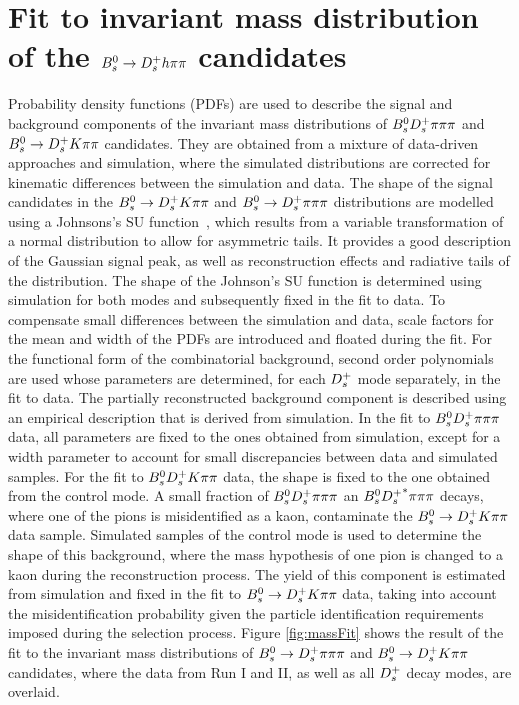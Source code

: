 \section{Fit to invariant mass distribution of the ${{B}^0_{s}}\rightarrow{\ensuremath{{D}^+_{s}}}{\ensuremath{h}}{\ensuremath{\pi}}{\ensuremath{\pi}}$ candidates}
\label{sec:Massfit}

Probability density functions (PDFs) are used to describe the signal and background components of the invariant mass distributions of ${{B}^0_{s}}{{D}^+_{s}}{\pi}{\pi}{\pi}$ and ${{B}^0_{s}}\rightarrow{\ensuremath{{D}^+_{s}}}{\ensuremath{K}}{\ensuremath{\pi}}{\ensuremath{\pi}}$ candidates.
They are obtained from a mixture of data-driven approaches and simulation, where the simulated distributions are corrected for kinematic differences between the simulation and data.\newline
The shape of the signal candidates in the ${{B}^0_{s}}\rightarrow{\ensuremath{{D}^+_{s}}}{\ensuremath{K}}{\ensuremath{\pi}}{\ensuremath{\pi}}$ and ${{B}^0_{s}}\rightarrow{\ensuremath{{D}^+_{s}}}{\ensuremath{\pi}}{\ensuremath{\pi}}{\ensuremath{\pi}}$ distributions are modelled using a Johnsons's SU function~\cite{10.2307/2332539}, 
which results from a variable transformation of a normal distribution to allow for asymmetric tails. 
It provides a good description of the Gaussian signal peak, as well as reconstruction effects and radiative tails of the distribution.
The shape of the Johnson's SU function is determined using simulation for both modes and subsequently fixed in the fit to data. 
To compensate small differences between the simulation and data, scale factors for the mean and width of the PDFs are introduced and floated during the fit.
For the functional form of the combinatorial background, second order polynomials are used whose parameters are determined, for each ${{D}^+_{s}}$ mode separately, in the fit to data.
The partially reconstructed background component is described using an empirical description that is derived from simulation. 
In the fit to ${{B}^0_{s}}{{D}^+_{s}}{\pi}{\pi}{\pi}$ data, all parameters are fixed to the ones obtained from simulation, except for a width parameter to account for small discrepancies between data and simulated samples.
For the fit to ${{B}^0_{s}}{{D}^+_{s}}{K}{\pi}{\pi}$ data, the shape is fixed to the one obtained from the control mode.
A small fraction of ${{B}^0_{s}}{{D}^+_{s}}{\pi}{\pi}{\pi}$ an ${{B}^0_{s}}{{D}^+_{s}}^{*}{\pi}{\pi}{\pi}$ decays, where one of the pions is misidentified as a kaon, contaminate the ${{B}^0_{s}}\rightarrow{\ensuremath{{D}^+_{s}}}{\ensuremath{K}}{\ensuremath{\pi}}{\ensuremath{\pi}}$ data sample.
Simulated samples of the control mode is used to determine the shape of this background, where the mass hypothesis of one pion is changed to a kaon during the reconstruction process. 
The yield of this component is estimated from simulation and fixed in the fit to ${{B}^0_{s}}\rightarrow{\ensuremath{{D}^+_{s}}}{\ensuremath{K}}{\ensuremath{\pi}}{\ensuremath{\pi}}$ data, 
taking into account the misidentification probability given the particle identification requirements imposed during the selection process.\newline
Figure \ref{fig:massFit} shows the result of the fit to the invariant mass distributions of ${{B}^0_{s}}\rightarrow{\ensuremath{{D}^+_{s}}}{\ensuremath{\pi}}{\ensuremath{\pi}}{\ensuremath{\pi}}$ and ${{B}^0_{s}}\rightarrow{\ensuremath{{D}^+_{s}}}{\ensuremath{K}}{\ensuremath{\pi}}{\ensuremath{\pi}}$ candidates, 
where the data from Run I and II, as well as all ${{D}^+_{s}}$ decay modes, are overlaid.  

